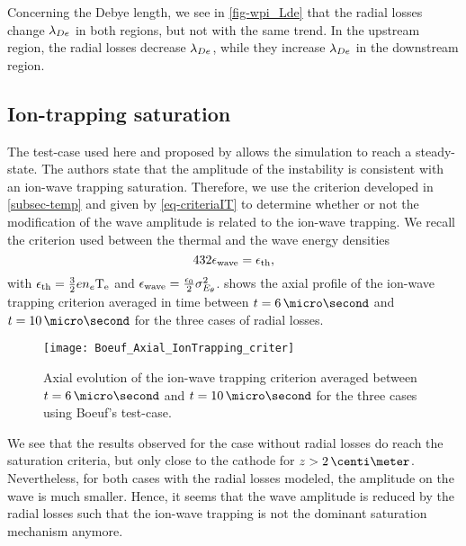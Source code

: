   Concerning the Debye length, we see in \cref{fig-wpi_Lde} that the radial losses change $\lambda_{De}$ in both regions, but not with the same trend.
  In the upstream region, the radial losses decrease $\lambda_{De}$, while they increase $\lambda_{De}$ in the downstream region.


\subsection{Ion-trapping saturation } \label{subsec-boeuf_iontrapping}

  The test-case used here and proposed by \citet{boeuf2018} allows the simulation to reach a steady-state.
  The authors state that the amplitude of the instability is consistent with an ion-wave trapping saturation.
  Therefore, we use the criterion developed in \cref{subsec-temp} and given by \cref{eq-criteriaIT} to determine whether or not the modification of the wave amplitude is related to the ion-wave trapping.
  We recall the criterion used between the thermal and the wave energy densities
  \begin{equation} 
    432 \epsilon_{\rm wave} = \epsilon_{\rm th},
  \end{equation}
  with $\epsilon_{\rm th} = \frac{3}{2} e n_e \mathrm{T_e}$ and $\epsilon_{\rm wave} = \frac{\epsilon_0}{2} \sigma_{E_{\theta}}^2$.
   shows the axial profile of the ion-wave trapping criterion averaged in time between $t=6\,\micro\second$ and $t=10\,\micro\second$ for the three cases of radial losses.

  \begin{figure}[hbt]
    \centering
    \texttt{[image: Boeuf\_Axial\_IonTrapping\_criter]}
    \caption{Axial evolution of the ion-wave trapping criterion averaged between $t=6\,\micro\second$ and $t=10\,\micro\second$ for the three cases using Boeuf's test-case. }
    \label{fig-ionwavetrapping_axial}
  \end{figure}

  We see that the results observed for the case without radial losses do reach the saturation criteria, but only close to the cathode for $z > 2\,\centi\meter$.
  Nevertheless, for both cases with the radial losses modeled, the amplitude on the wave is much smaller.
  Hence, it seems that the wave amplitude is reduced by the radial losses such that the ion-wave trapping is not the dominant saturation mechanism anymore.



